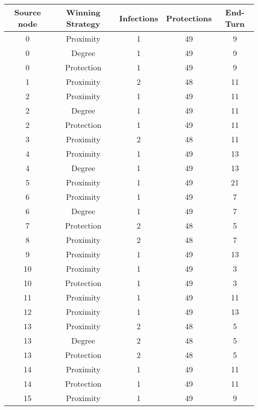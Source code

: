 \documentclass[results.tex]{subfiles}
\begin{document}
\begin{center}
  \begin{tabular}{| c || c | c | c | c |}
    \hline
    {\bfseries Source node} & {\bfseries Winning Strategy} & {\bfseries Infections} & {\bfseries Protections} & {\bfseries End-Turn} \\  %
    \hline\hline
    0 & Proximity & 1 & 49 & 9 \\ 
    \hline
    0 & Degree & 1 & 49 & 9 \\ 
    \hline
    0 & Protection & 1 & 49 & 9 \\ 
    \hline
    1 & Proximity & 2 & 48 & 11 \\ 
    \hline
    2 & Proximity & 1 & 49 & 11 \\ 
    \hline
    2 & Degree & 1 & 49 & 11 \\ 
    \hline
    2 & Protection & 1 & 49 & 11 \\ 
    \hline
    3 & Proximity & 2 & 48 & 11 \\ 
    \hline
    4 & Proximity & 1 & 49 & 13 \\ 
    \hline
    4 & Degree & 1 & 49 & 13 \\ 
    \hline
    5 & Proximity & 1 & 49 & 21 \\ 
    \hline
    6 & Proximity & 1 & 49 & 7 \\ 
    \hline
    6 & Degree & 1 & 49 & 7 \\ 
    \hline
    7 & Protection & 2 & 48 & 5 \\ 
    \hline
    8 & Proximity & 2 & 48 & 7 \\ 
    \hline
    9 & Proximity & 1 & 49 & 13 \\ 
    \hline
    10 & Proximity & 1 & 49 & 3 \\ 
    \hline
    10 & Protection & 1 & 49 & 3 \\ 
    \hline
    11 & Proximity & 1 & 49 & 11 \\ 
    \hline
    12 & Proximity & 1 & 49 & 13 \\ 
    \hline
    13 & Proximity & 2 & 48 & 5 \\ 
    \hline
    13 & Degree & 2 & 48 & 5 \\ 
    \hline
    13 & Protection & 2 & 48 & 5 \\ 
    \hline
    14 & Proximity & 1 & 49 & 11 \\ 
    \hline
    14 & Protection & 1 & 49 & 11 \\ 
    \hline
    15 & Proximity & 1 & 49 & 9 \\ 
    \hline

\end{tabular}
\end{center}
\end{document}
